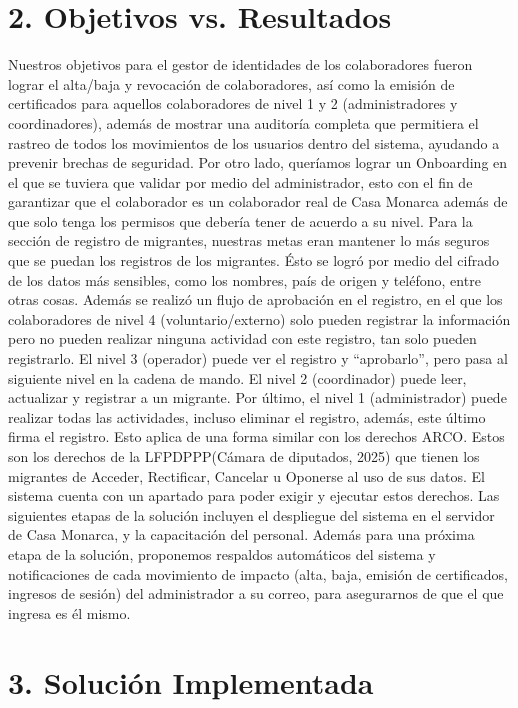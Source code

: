 \documentclass[10pt,letterpaper]{report}
\begin{document}
\section*{2. Objetivos vs. Resultados}
 Nuestros objetivos para el gestor de identidades de los colaboradores fueron lograr el alta/baja y revocación de colaboradores, así como la emisión de certificados para aquellos colaboradores de nivel 1 y 2 (administradores y coordinadores), además de mostrar una auditoría completa que permitiera el rastreo de todos los movimientos de los usuarios dentro del sistema, ayudando a prevenir brechas de seguridad. Por otro lado, queríamos lograr un Onboarding en el que se tuviera que validar por medio del administrador, esto con el fin de garantizar que el colaborador es un colaborador real de Casa Monarca además de que solo tenga los permisos que debería tener de acuerdo a su nivel.
Para la sección de registro de migrantes, nuestras metas eran mantener lo más seguros que se puedan los registros de los migrantes. Ésto se logró por medio del cifrado de los datos  más sensibles, como los nombres, país de origen y teléfono, entre otras cosas. Además se realizó un flujo de aprobación en el registro, en el que los colaboradores de nivel 4 (voluntario/externo)  solo pueden registrar la información pero no pueden realizar ninguna actividad con este registro, tan solo pueden registrarlo. El nivel 3 (operador) puede ver el registro y “aprobarlo”, pero pasa al siguiente nivel en la cadena de mando. El nivel 2 (coordinador) puede leer, actualizar y registrar a un migrante. Por último, el nivel 1 (administrador) puede realizar todas las actividades, incluso eliminar el registro, además, este último firma el registro. Esto aplica de una forma similar con los derechos ARCO. Estos son los derechos de la LFPDPPP(Cámara de diputados, 2025) que tienen los migrantes de Acceder, Rectificar, Cancelar u Oponerse al uso de sus datos. El sistema cuenta con un apartado para poder exigir y ejecutar estos derechos. 
Las siguientes etapas de la solución incluyen el despliegue del sistema en el servidor de Casa Monarca, y la capacitación del personal. Además para una próxima etapa de la solución, proponemos respaldos automáticos del sistema y notificaciones de cada movimiento de impacto (alta, baja, emisión de certificados, ingresos de sesión) del administrador a su correo, para asegurarnos de que el que ingresa es él mismo.


 
\section*{3. Solución Implementada}
 
\end{document}
